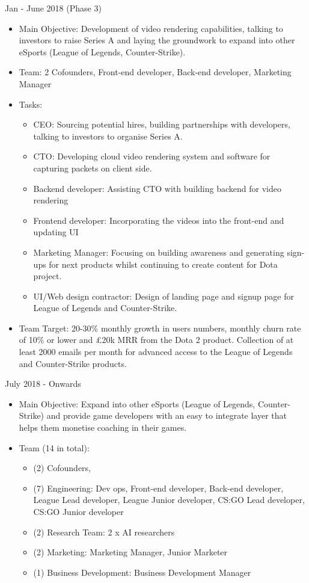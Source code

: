 \documentclass[12pt]{report} %
\begin{document}
Jan - June 2018 (Phase 3)
\begin{itemize}
\item Main Objective: Development of video rendering capabilities, talking to investors to raise Series A and laying the groundwork to expand into other eSports (League of Legends, Counter-Strike).
\item Team:  2 Cofounders, Front-end developer, Back-end developer, Marketing Manager
\item Tasks:
\begin{itemize}
\item CEO: Sourcing potential hires, building partnerships with developers, talking to investors to organise Series A.
\item CTO: Developing cloud video rendering system and software for capturing packets on client side.
\item Backend developer: Assisting CTO with building backend for video rendering
\item Frontend developer: Incorporating the videos into the front-end and updating UI
\item Marketing Manager: Focusing on building awareness and generating sign-ups for next products whilst continuing to create content for Dota project.
\item UI/Web design contractor: Design of landing page and signup page for League of Legends and Counter-Strike.
\end{itemize}
\item Team Target: 20-30\% monthly growth in users numbers, monthly churn rate of 10\% or lower and \pounds20k MRR from the Dota 2 product. Collection of at least 2000 emails per month for advanced access to the League of Legends and Counter-Strike products.
\end{itemize}

July 2018 - Onwards
\begin{itemize}
\item Main Objective: Expand into other eSports (League of Legends, Counter-Strike) and provide game developers with an easy to integrate layer that helps them monetise coaching in their games.
\item Team (14 in total):  
\begin{itemize}
\item (2) Cofounders, 
\item (7) Engineering: Dev ops, Front-end developer, Back-end developer, League Lead developer, League Junior developer, CS:GO Lead developer, CS:GO Junior developer
\item (2) Research Team: 2 x AI researchers
\item (2) Marketing: Marketing Manager, Junior Marketer
\item (1) Business Development: Business Development Manager\\
\end{itemize}
\end{itemize}
\end{document}
